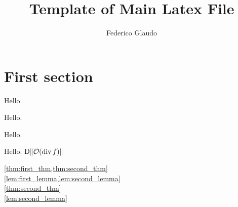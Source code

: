 \documentclass[a4paper,12pt]{article}
\title{Template of Main Latex File}
\author{Federico Glaudo}
\begin{document}
 
\maketitle
\tableofcontents

\section{First section}
\begin{theorem}\label{thm:first_thm}
    Hello.
\end{theorem}
\begin{theorem}\label{thm:second_thm}
    Hello.
\end{theorem}
\begin{lemma}\label{lem:first_lemma}
    Hello.
\end{lemma}
\begin{lemma}\label{lem:second_lemma}
    Hello. $\mathrm D\lVert\mathcal{O}(\operatorname{div} f)\rVert$
\end{lemma}
\cref{thm:first_thm,thm:second_thm}\\
\cref{lem:first_lemma,lem:second_lemma}\\
\cref{thm:second_thm}\\
\cref{lem:second_lemma}

% 
% 
\end{document}
